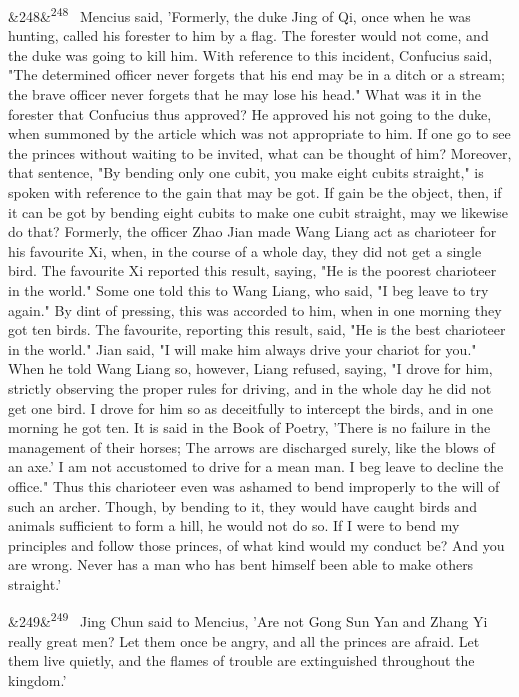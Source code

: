 \documentclass[12pt]{article}
\newcommand{\para}[1][]{\par\noindent\ifx&#1&\else\textsuperscript{\footnotesize #1}~\fi}
\begin{document}
\para[248] Mencius said, 'Formerly, the duke Jing of Qi, once when he was hunting, called his forester to him by a flag. The forester would not come, and the duke was going to kill him. With reference to this incident, Confucius said, "The determined officer never forgets that his end may be in a ditch or a stream; the brave officer never forgets that he may lose his head." What was it in the forester that Confucius thus approved? He approved his not going to the duke, when summoned by the article which was not appropriate to him. If one go to see the princes without waiting to be invited, what can be thought of him? Moreover, that sentence, "By bending only one cubit, you make eight cubits straight," is spoken with reference to the gain that may be got. If gain be the object, then, if it can be got by bending eight cubits to make one cubit straight, may we likewise do that? Formerly, the officer Zhao Jian made Wang Liang act as charioteer for his favourite Xi, when, in the course of a whole day, they did not get a single bird. The favourite Xi reported this result, saying, "He is the poorest charioteer in the world." Some one told this to Wang Liang, who said, "I beg leave to try again." By dint of pressing, this was accorded to him, when in one morning they got ten birds. The favourite, reporting this result, said, "He is the best charioteer in the world." Jian said, "I will make him always drive your chariot for you." When he told Wang Liang so, however, Liang refused, saying, "I drove for him, strictly observing the proper rules for driving, and in the whole day he did not get one bird. I drove for him so as deceitfully to intercept the birds, and in one morning he got ten. It is said in the Book of Poetry, 'There is no failure in the management of their horses; The arrows are discharged surely, like the blows of an axe.' I am not accustomed to drive for a mean man. I beg leave to decline the office." Thus this charioteer even was ashamed to bend improperly to the will of such an archer. Though, by bending to it, they would have caught birds and animals sufficient to form a hill, he would not do so. If I were to bend my principles and follow those princes, of what kind would my conduct be? And you are wrong. Never has a man who has bent himself been able to make others straight.'

\para[249] Jing Chun said to Mencius, 'Are not Gong Sun Yan and Zhang Yi really great men? Let them once be angry, and all the princes are afraid. Let them live quietly, and the flames of trouble are extinguished throughout the kingdom.'
\end{document}
